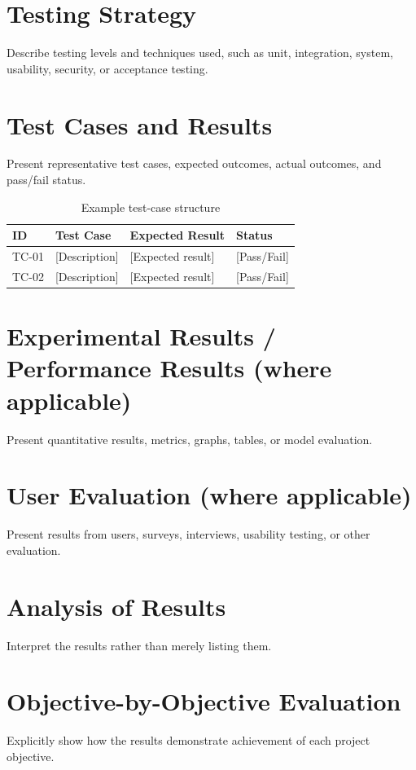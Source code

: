 \documentclass[12pt,a4paper]{report}
\begin{document}
\section{Testing Strategy}
Describe testing levels and techniques used, such as unit, integration, system, usability, security, or acceptance testing.

\section{Test Cases and Results}
Present representative test cases, expected outcomes, actual outcomes, and pass/fail status.

\begin{table}[H]
\centering
\caption{Example test-case structure}
\begin{tabular}{p{}p{}p{}p{}}
\toprule
ID & Test Case & Expected Result & Status\\
\midrule
TC-01 & [Description] & [Expected result] & [Pass/Fail]\\
TC-02 & [Description] & [Expected result] & [Pass/Fail]\\
\bottomrule
\end{tabular}
\end{table}

\section{Experimental Results / Performance Results (where applicable)}
Present quantitative results, metrics, graphs, tables, or model evaluation.

\section{User Evaluation (where applicable)}
Present results from users, surveys, interviews, usability testing, or other evaluation.

\section{Analysis of Results}
Interpret the results rather than merely listing them.

\section{Objective-by-Objective Evaluation}
Explicitly show how the results demonstrate achievement of each project objective.
\end{document}

